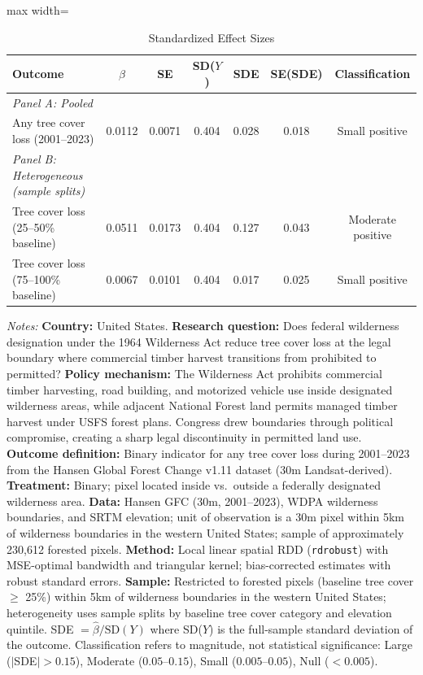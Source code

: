 \begin{table}[t]
\centering
\caption{Standardized Effect Sizes}
\label{tab:sde}
\begin{adjustbox}{max width=\textwidth}
\begin{tabular}{lcccccc}
\hline\hline
Outcome & $\hat{\beta}$ & SE & SD($Y$) & SDE & SE(SDE) & Classification \\
\hline
\textit{Panel A: Pooled} & & & & & & \\
\quad Any tree cover loss (2001--2023) & 0.0112 & 0.0071 & 0.404 & 0.028 & 0.018 & Small positive \\
\hline
\textit{Panel B: Heterogeneous (sample splits)} & & & & & & \\
\quad Tree cover loss (25--50\% baseline) & 0.0511 & 0.0173 & 0.404 & 0.127 & 0.043 & Moderate positive \\
\quad Tree cover loss (75--100\% baseline) & 0.0067 & 0.0101 & 0.404 & 0.017 & 0.025 & Small positive \\
\hline\hline
\end{tabular}
\end{adjustbox}
\begin{tablenotes}[flushleft]
\small
\item \textit{Notes:} \textbf{Country:} United States. \textbf{Research question:} Does federal wilderness designation under the 1964 Wilderness Act reduce tree cover loss at the legal boundary where commercial timber harvest transitions from prohibited to permitted? \textbf{Policy mechanism:} The Wilderness Act prohibits commercial timber harvesting, road building, and motorized vehicle use inside designated wilderness areas, while adjacent National Forest land permits managed timber harvest under USFS forest plans. Congress drew boundaries through political compromise, creating a sharp legal discontinuity in permitted land use. \textbf{Outcome definition:} Binary indicator for any tree cover loss during 2001--2023 from the Hansen Global Forest Change v1.11 dataset (30m Landsat-derived). \textbf{Treatment:} Binary; pixel located inside vs.~outside a federally designated wilderness area. \textbf{Data:} Hansen GFC (30m, 2001--2023), WDPA wilderness boundaries, and SRTM elevation; unit of observation is a 30m pixel within 5km of wilderness boundaries in the western United States; sample of approximately 230,612 forested pixels. \textbf{Method:} Local linear spatial RDD (\texttt{rdrobust}) with MSE-optimal bandwidth and triangular kernel; bias-corrected estimates with robust standard errors. \textbf{Sample:} Restricted to forested pixels (baseline tree cover $\geq$ 25\%) within 5km of wilderness boundaries in the western United States; heterogeneity uses sample splits by baseline tree cover category and elevation quintile. SDE $= \hat{\beta} / \text{SD}(Y)$ where SD($Y$) is the full-sample standard deviation of the outcome. Classification refers to magnitude, not statistical significance: Large ($|$SDE$| > 0.15$), Moderate ($0.05$--$0.15$), Small ($0.005$--$0.05$), Null ($< 0.005$).
\end{tablenotes}
\end{table}
